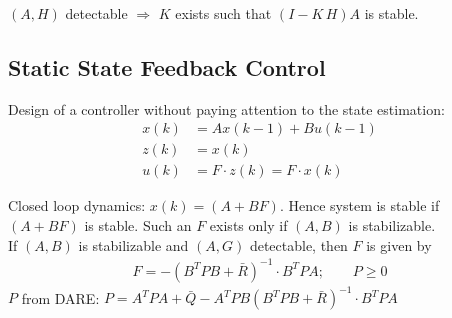 \documentclass[landscape,a4paper,8pt]{scrartcl}
\begin{document}
\begin{multicols*}{3}



%
%

$(A,H)$ detectable $ \Rightarrow$ $K$ exists such that $(I-K \, H) A$ is stable.

\subsection{Static State Feedback Control}
Design of a controller without paying attention to the state estimation:
\begin{align*}
x(k) &= A x(k-1) + B u(k-1) \tag{Process without noise} \\
z(k) &= x(k)  \tag{Perfect State information} \\
u(k) &= F \cdot z(k) = F \cdot x(k) \tag{Control Law}
\end{align*}

Closed loop dynamics: $x(k) = (A+B F)$. Hence system is stable if $(A+B F)$ is stable. Such an $F$ exists only if $(A,B)$ is stabilizable. \\
If $(A,B)$ is stabilizable and $(A,G)$ detectable, then $F$ is given by
\begin{align*}
F = -(B^T P B + \bar{R})^{-1} \cdot B^T P A; \qquad P\geq 0
\end{align*}
$P$ from DARE: $P = A^T P A + \bar{Q} - A^T P B( B^T P B + \bar{R})^{-1} \cdot B^T P A$


\end{multicols*}
\end{document}
